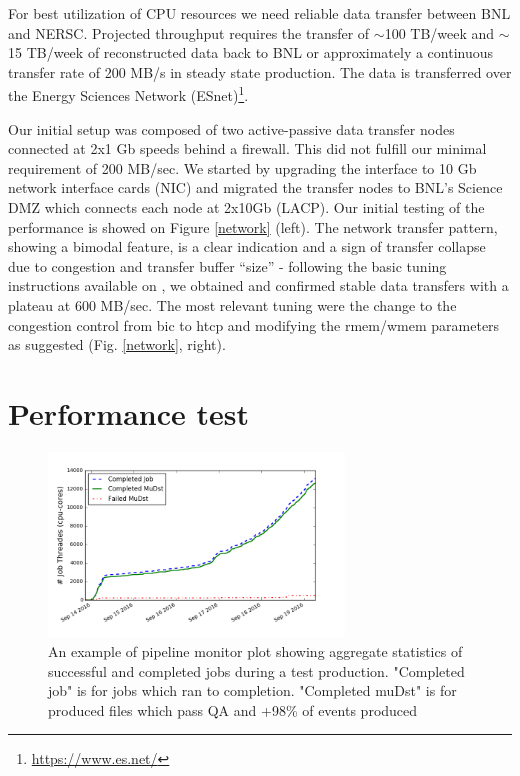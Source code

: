 \documentclass[a4paper]{jpconf}
\begin{document}
For best utilization of CPU resources we need reliable data transfer between
BNL and NERSC. Projected throughput requires the transfer of $\sim$100 TB/week
and $\sim$15 TB/week of reconstructed data back to BNL or approximately a
continuous transfer rate of 200 MB/s in steady state production. The data is
transferred over the Energy Sciences Network (ESnet)\footnote{\url{https://www.es.net/}}. 

Our initial setup was composed of two active-passive data transfer nodes connected at 2x1 Gb speeds behind a firewall.  This did not fulfill our minimal requirement of 200 MB/sec. We started by upgrading the interface to 10 Gb network interface cards (NIC) and migrated the transfer nodes to BNL's Science DMZ which connects each node at 2x10Gb (LACP). Our initial testing of the performance is showed on Figure \ref{network} (left). The network transfer pattern, showing a bimodal feature, is a clear indication and a sign of transfer collapse  due to congestion and transfer buffer “size”  - following the basic tuning instructions available on \cite{esnet_opt}, we obtained and confirmed stable data transfers with a plateau at 600 MB/sec. The most relevant tuning were the change to the congestion control from bic to htcp and modifying the rmem/wmem parameters as suggested (Fig. \ref{network}, right). 


\section{Performance test} 

\begin{figure}[h] \begin{center}
  \includegraphics[width=0.7\textwidth]{Px3id_production_mon_2}
  \caption{\label{production_mon} An example of pipeline monitor plot showing
  aggregate statistics of successful and completed jobs during a test
  production.  "Completed job" is for jobs which ran to completion. "Completed
  muDst" is for produced files which pass QA and +98\% of events produced}
\end{center} \end{figure}
\end{document}
